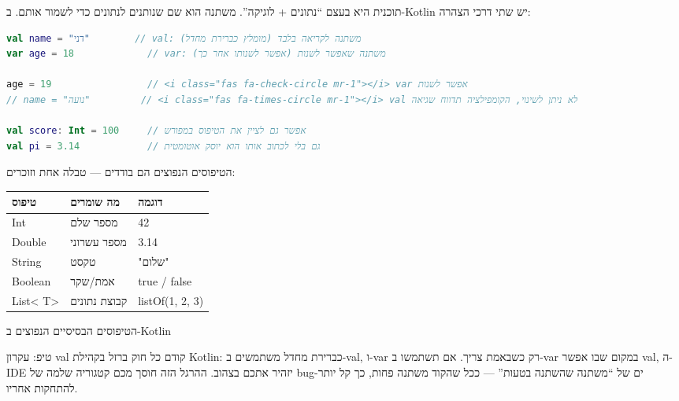 


תוכנית היא בעצם “נתונים + לוגיקה”. משתנה הוא שם שנותנים לנתונים כדי לשמור אותם. ב-Kotlin יש שתי דרכי הצהרה:

\begin{lstlisting}[language=Kotlin]
val name = "דני"        // val: משתנה לקריאה בלבד (מומלץ כברירת מחדל)
var age = 18             // var: משתנה שאפשר לשנות (אפשר לשנותו אחר כך)

age = 19                 // <i class="fas fa-check-circle mr-1"></i> var אפשר לשנות
// name = "נועה"         // <i class="fas fa-times-circle mr-1"></i> val לא ניתן לשינוי, הקומפילציה תדווח שגיאה

val score: Int = 100     // אפשר גם לציין את הטיפוס במפורש
val pi = 3.14            // גם בלי לכתוב אותו הוא יוסק אוטומטית
\end{lstlisting}

הטיפוסים הנפוצים הם בודדים — טבלה אחת וזוכרים:

\begin{center}
\begin{tabularx}{\linewidth}{|X|X|X|}
\hline
\textbf{טיפוס} & \textbf{מה שומרים} & \textbf{דוגמה} \tabularnewline
\hline
Int & מספר שלם & 42 \tabularnewline
Double & מספר עשרוני & 3.14 \tabularnewline
String & טקסט & "שלום" \tabularnewline
Boolean & אמת/שקר & true / false \tabularnewline
List< T> & קבוצת נתונים & listOf(1, 2, 3) \tabularnewline
\hline
\end{tabularx}
\end{center}

\begin{center}\small\color{gray}הטיפוסים הבסיסיים הנפוצים ב-Kotlin\end{center}

\begin{tcbinfo}{טיפ: עקרון val קודם כל}
חוק ברזל בקהילת Kotlin: כברירת מחדל משתמשים ב-val, ו-var רק כשבאמת צריך. אם תשתמשו ב-var במקום שבו אפשר val, ה-IDE יזהיר אתכם בצהוב. ההרגל הזה חוסך מכם קטגוריה שלמה של bug-ים של “משתנה שהשתנה בטעות” — ככל שהקוד משתנה פחות, כך קל יותר להתחקות אחריו.

\end{tcbinfo}

